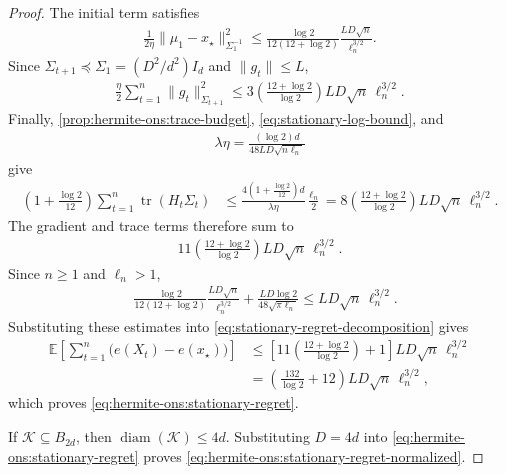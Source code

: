 \documentclass{article}
\theoremstyle{plain}
\theoremstyle{definition}
\theoremstyle{plain}
\newcommand{\tr}{\operatorname{tr}}
\newcommand{\E}{\mathbb E}
\newcommand{\cK}{\mathcal K}
\begin{document}
\begin{proof}
    The initial term satisfies
    \begin{align}
        \frac{1}{2\eta}
        \|\mu_1-x_\star\|_{\Sigma_1^{-1}}^2
        \leq
        \frac{\log2}{12(12+\log2)}
        \frac{LD\sqrt n}{\ell_n^{3/2}}.
        \label{eq:stationary-initial-regret}
    \end{align}
    Since
    $\Sigma_{t+1}\preceq\Sigma_1=(D^2/d^2)I_d$
    and $\|g_t\|\leq L$,
    \begin{align}
        \frac{\eta}{2}
        \sum_{t=1}^n
        \|g_t\|_{\Sigma_{t+1}}^2
        \leq
        3
        \left(
        \frac{12+\log2}{\log2}
        \right)
        LD\sqrt n\,\ell_n^{3/2}.
        \label{eq:stationary-gradient-regret}
    \end{align}
    Finally, \cref{prop:hermite-ons:trace-budget},
    \eqref{eq:stationary-log-bound}, and
    \begin{align}
        \lambda\eta
        =
        \frac{(\log2)d}
        {48LD\sqrt{n\ell_n}}
    \end{align}
    give
    \begin{align}
        \left(
        1+\frac{\log2}{12}
        \right)
        \sum_{t=1}^n
        \tr(H_t\Sigma_t)
         & \leq
        \frac{
            4\left(1+\frac{\log2}{12}\right)d
        }{\lambda\eta}
        \frac{\ell_n}{2}
        =
        8
        \left(
        \frac{12+\log2}{\log2}
        \right)
        LD\sqrt n\,\ell_n^{3/2}.
        \label{eq:stationary-trace-regret}
    \end{align}
    The gradient and trace terms therefore sum to
    \begin{align}
        11
        \left(
        \frac{12+\log2}{\log2}
        \right)
        LD\sqrt n\,\ell_n^{3/2}.
    \end{align}
    Since $n\geq1$ and $\ell_n>1$,
    \begin{align}
         & \frac{\log2}{12(12+\log2)}
        \frac{LD\sqrt n}{\ell_n^{3/2}}
        +
        \frac{LD\log2}{48\sqrt{\pi\ell_n}}
        \leq
        LD\sqrt n\,\ell_n^{3/2}.
    \end{align}
    Substituting these estimates into
    \eqref{eq:stationary-regret-decomposition} gives
    \begin{align}
        \E\left[
            \sum_{t=1}^n
            \bigl(e(X_t)-e(x_\star)\bigr)
            \right]
         & \leq
        \left[
            11
            \left(
            \frac{12+\log2}{\log2}
            \right)
            +1
            \right]
        LD\sqrt n\,\ell_n^{3/2}
        \\
         & =
        \left(
        \frac{132}{\log2}+12
        \right)
        LD\sqrt n\,\ell_n^{3/2},
    \end{align}
    which proves \eqref{eq:hermite-ons:stationary-regret}.

    If $\cK\subseteq B_{2d}$, then
    $\operatorname{diam}(\cK)\leq4d$. Substituting $D=4d$ into
    \eqref{eq:hermite-ons:stationary-regret} proves
    \eqref{eq:hermite-ons:stationary-regret-normalized}.
\end{proof}
\end{document}
